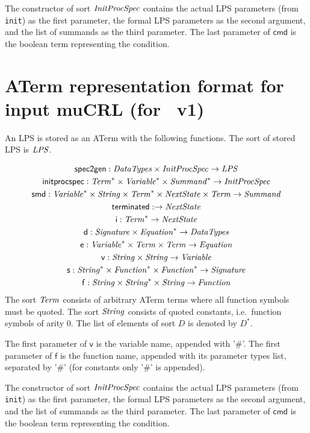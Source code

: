 \documentclass[fleqn,a4paper,dvips]{article}
\newcommand{\aterm}[1]{\mathsf{#1}}
\newcommand{\afunc}[3]{\aterm{#1}:#2\rightarrow#3}
\begin{document}
The constructor of sort $\mathit{InitProcSpec}$ contains the actual LPS
parameters (from \texttt{init}) as the first parameter, the formal LPS
parameters as the second argument, and the list of summands as the
third parameter. The last parameter of $\mathsf{cmd}$ is the boolean term
representing the condition.

\newpage
\section{ATerm representation format for input muCRL (for \mcrl\ v1)}
An LPS is stored as an ATerm with the following functions. The sort
of stored LPS is $\mathit{LPS}$.

\begin{gather*}
\afunc{spec2gen}{\nm{DataTypes}\x\nm{InitProcSpec}}{\nm{LPS}}\\
\afunc{initprocspec}{\nm{Term}^*\x\nm{Variable}^*\x\nm{Summand}^*}{\nm{InitProcSpec}}\\
\afunc{smd}{\nm{Variable}^*\x\nm{String}\x\nm{Term}^*\x\nm{NextState}\x\nm{Term}}{\nm{Summand}}\\
\afunc{terminated}{}{\nm{NextState}}\\
\afunc{i}{\nm{Term}^*}{\nm{NextState}}\\
\afunc{d}{\nm{Signature}\x\nm{Equation}^*}{\nm{DataTypes}}\\
\afunc{e}{\nm{Variable}^*\x\nm{Term}\x\nm{Term}}{\nm{Equation}}\\
\afunc{v}{\nm{String}\x\nm{String}}{\nm{Variable}}\\
\afunc{s}{\nm{String}^*\x\nm{Function}^*\x\nm{Function}^*}{\nm{Signature}}\\
\afunc{f}{\nm{String}\x\nm{String}^{*}\x\nm{String}}{\nm{Function}}
\end{gather*}
The sort $\mathit{Term}$ consists of arbitrary ATerm terms where all function
symbols must be quoted. The sort $\mathit{String}$ consists of quoted constants,
i.e.\ function symbols of arity 0. The list
of elements of sort $D$ is denoted by $D^{*}$.

The first parameter of $\mathsf{v}$ is the variable name, appended with '\#'.
The first parameter of $\mathsf{f}$ is the function name, appended
with its parameter types list, separated by '\#' (for constants only '\#' is appended).

The constructor of sort $\mathit{InitProcSpec}$ contains the actual LPS
parameters (from \texttt{init}) as the first parameter, the formal LPS
parameters as the second argument, and the list of summands as the
third parameter. The last parameter of $\mathsf{cmd}$ is the boolean term
representing the condition.

%
%
\end{document}
